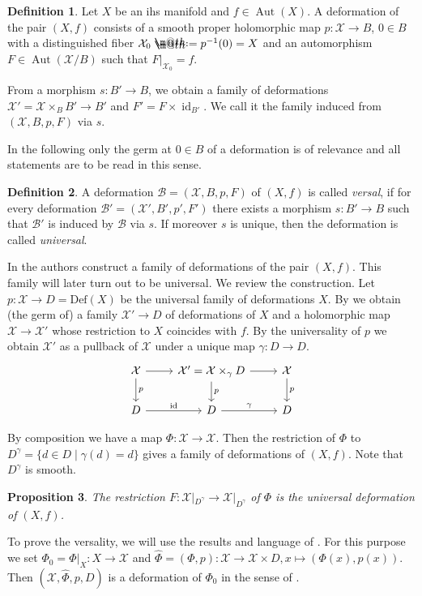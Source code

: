 \documentclass{amsart}
\makeatletter
\theoremstyle{definition}
\newtheorem{definition}{Definition}[section]
\theoremstyle{plain}
\newtheorem{proposition}[definition]{Proposition}
\DeclareMathOperator{\id}{id}
\DeclareMathOperator{\Aut}{Aut}
\newcommand{\X}{\mathcal{X}}
\newcommand*{\defeq}{\mathrel{\rlap{%
                     \raisebox{0.3ex}{$\m@th\cdot$}}%
                     \raisebox{-0.3ex}{$\m@th\cdot$}}%
                     =}
\makeatother
\begin{document}
\begin{definition}
 Let $X$ be an ihs manifold and $f\in \Aut(X)$. A deformation of the pair $(X,f)$ consists of a smooth proper holomorphic map $p \colon \X \rightarrow B$, $0\in B$ with a distinguished fiber $\X_0 \defeq p^{-1}(0)=X$ and an automorphism $F \in \Aut(\X/B)$ such that $F|_{\X_0}=f$.
\end{definition}

From a morphism $s \colon B' \rightarrow B$, we obtain a family of deformations $\X'=\X \times_B B' \rightarrow B'$ and $F' = F \times \id_{B'}$. We call it the family induced from $(\X,B,p,F)$ via $s$.

In the following only the germ at $0 \in B$ of a deformation is of relevance and all statements are to be read in this sense.

\begin{definition}
 A deformation $\mathcal{B}=(\X,B,p,F)$ of $(X,f)$ is called \emph{versal}, if for every deformation $\mathcal{B}'=(\X',B',p',F')$ there exists a morphism $s\colon B' \rightarrow B$ such that $\mathcal{B}'$ is induced by $\mathcal{B}$ via $s$.
 If moreover $s$ is unique, then the deformation is called \emph{universal}.
\end{definition}

In \cite[\S 4]{bcs} the authors construct a family of deformations of the pair $(X,f)$.
This family will later turn out to be universal. We review the construction.
Let $p \colon \mathcal{X} \rightarrow D=\mbox{Def}(X)$ be the universal family of deformations $X$. By \cite[Thm 8.1]{horikawa:III} we obtain (the germ of) a family
$\mathcal{X}' \rightarrow D$ of deformations of $X$ and a holomorphic map $ \mathcal{X}\rightarrow \mathcal{X}'$ whose restriction to $X$ coincides with $f$. By the universality of $p$ we obtain $\mathcal{X}'$ as a pullback of $\mathcal{X}$ under a unique map $\gamma \colon D \rightarrow D$.
\[
\begin{tikzcd}
 \X \arrow[r," "]\arrow[d,"p"] & \X'=\X \times_\gamma D  \arrow[r,""]\arrow[d,"p"]& \X \arrow[d,"p"]\\
 D \arrow[r,"\id"]& D \arrow[r,"\gamma"] &  D
\end{tikzcd}
\]

By composition we have a map $\Phi \colon \mathcal{X} \rightarrow \mathcal{X}$.
Then the restriction of $\Phi$ to $D^\gamma= \{d \in D \mid \gamma(d)=d\}$
gives a family of deformations of $(X,f)$. Note that $D^{\gamma}$ is smooth.

\begin{proposition}
The restriction
$F \colon \mathcal{X}|_{D^\gamma} \rightarrow \X|_{D^\gamma}$ of $\Phi$ is the universal deformation of $(X,f)$.
\end{proposition}\label{prop:universal}
To prove the versality, we will use the results and language of \cite{horikawa:I}. For this purpose we set
$\Phi_0  = \Phi|_X \colon X \rightarrow \X$ and $\hat{\Phi}=(\Phi,p)\colon \X \rightarrow \X \times D, x\mapsto (\Phi(x),p(x))$.
Then $(\X,\hat{\Phi},p,D)$ is a deformation of $\Phi_0$ in the sense of \cite[Def.\ 1.1]{horikawa:I}.
\end{document}
